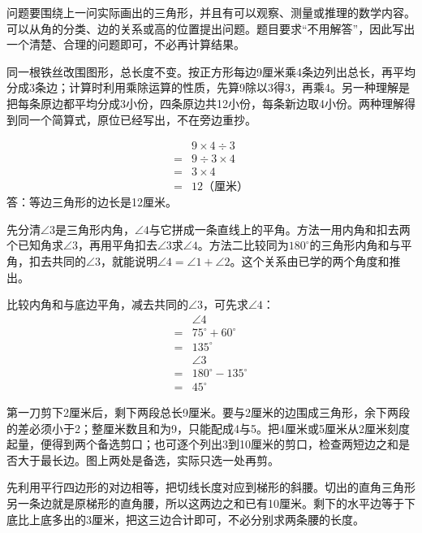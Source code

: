 \documentclass[multi=snippet,border=0pt]{standalone}
\newenvironment{snippet}[3]{\begin{minipage}{#1bp}\color{answerred}\fontsize{#2}{#3}\selectfont\raggedright}{\end{minipage}}
\begin{document}
\begin{snippet}{505}{11.5}{14}问题要围绕上一问实际画出的三角形，并且有可以观察、测量或推理的数学内容。可以从角的分类、边的关系或高的位置提出问题。题目要求“不用解答”，因此写出一个清楚、合理的问题即可，不必再计算结果。\end{snippet}
\begin{snippet}{505}{11.5}{14}同一根铁丝改围图形，总长度不变。按正方形每边9厘米乘4条边列出总长，再平均分成3条边；计算时利用乘除运算的性质，先算9除以3得3，再乘4。另一种理解是把每条原边都平均分成3小份，四条原边共12小份，每条新边取4小份。两种理解得到同一个简算式，原位已经写出，不在旁边重抄。\end{snippet}
\begin{snippet}{359}{10.5}{12.8}\[\begin{aligned}&9\times4\div3\\={}&9\div3\times4\\={}&3\times4\\={}&12\text{（厘米）}\end{aligned}\]答：等边三角形的边长是12厘米。\end{snippet}
\begin{snippet}{505}{11.5}{14}先分清\(\angle3\)是三角形内角，\(\angle4\)与它拼成一条直线上的平角。方法一用内角和扣去两个已知角求\(\angle3\)，再用平角扣去\(\angle3\)求\(\angle4\)。方法二比较同为\(180^\circ\)的三角形内角和与平角，扣去共同的\(\angle3\)，就能说明\(\angle4=\angle1+\angle2\)。这个关系由已学的两个角度和推出。\par 比较内角和与底边平角，减去共同的\(\angle3\)，可先求\(\angle4\)：\[\begin{aligned}&\angle4\\={}&75^\circ+60^\circ\\={}&135^\circ\\&\angle3\\={}&180^\circ-135^\circ\\={}&45^\circ\end{aligned}\]\end{snippet}
\begin{snippet}{505}{11.5}{14}第一刀剪下2厘米后，剩下两段总长9厘米。要与2厘米的边围成三角形，余下两段的差必须小于2；整厘米数且和为9，只能配成4与5。把4厘米或5厘米从2厘米刻度起量，便得到两个备选剪口；也可逐个列出3到10厘米的剪口，检查两短边之和是否大于最长边。图上两处是备选，实际只选一处再剪。\end{snippet}
\begin{snippet}{505}{11.5}{14}先利用平行四边形的对边相等，把切线长度对应到梯形的斜腰。切出的直角三角形另一条边就是原梯形的直角腰，所以这两边之和已有10厘米。剩下的水平边等于下底比上底多出的3厘米，把这三边合计即可，不必分别求两条腰的长度。\end{snippet}
\end{document}
